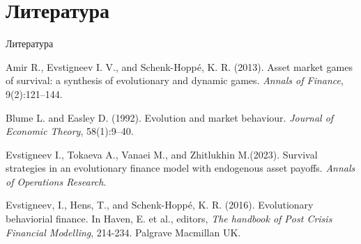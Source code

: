 \documentclass[aspectratio=169]{beamer}
\theoremstyle{definition}
\theoremstyle{remark}
\begin{document}
\section{Литература}
    \begin{frame}{Литература}
    
\nocite{*}
\printbibliography

\begin{thebibliography}{6}



 Amir R., Evstigneev I. V., and Schenk-Hoppé, K. R. (2013).
\newblock Asset market games of survival: a synthesis of evolutionary and dynamic games.
{\em Annals of Finance}, 9(2):121–144.


 Blume L. and Easley D. (1992).
\newblock Evolution and market behaviour.
{\em Journal of Economic Theory}, 58(1):9–40.


 Evstigneev I., Tokaeva A., Vanaei M., and Zhitlukhin M.(2023).
\newblock Survival strategies in an evolutionary finance model with endogenous asset payoffs.
{\em Annals of Operations Research}.


 Evstigneev, I., Hens, T., and Schenk-Hoppé, K. R. (2016).
\newblock Evolutionary behaviorial finance. In Haven, E. et al., editors, 
{\em The handbook of Post Crisis Financial Modelling}, 214-234. Palgrave Macmillan UK.


\end{thebibliography}
   
\end{frame}


 
\end{document}
